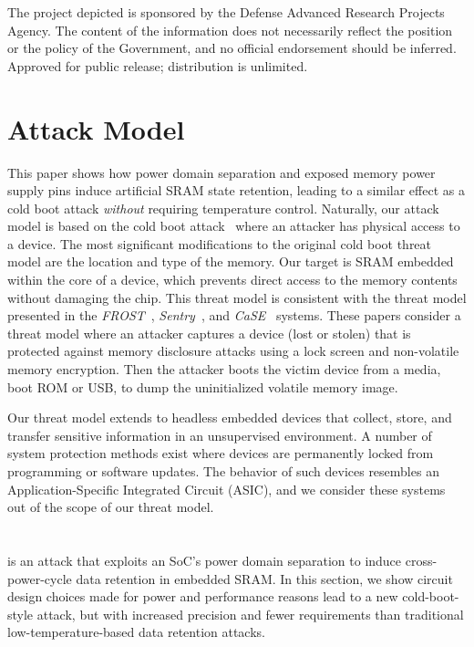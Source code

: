 
\begin{acks}
The project depicted is sponsored by the Defense Advanced Research Projects Agency. The content of the information does
not necessarily reflect the position or the policy of the Government, and no official endorsement should be inferred.
Approved for public release; distribution is unlimited.
\end{acks}


\section{Attack Model}
\label{sec_attack_model}

This paper shows how power domain separation and exposed memory power supply pins induce artificial SRAM state retention, leading to a similar effect as a cold boot attack \textit{without} requiring temperature control.
Naturally, our attack model is based on the cold boot attack~\cite{halderman2009lest} where an attacker has physical access to a device. 
The most significant modifications to the original cold boot threat model are the location and type of the memory. 
Our target is SRAM embedded within the core of a device, which prevents direct access to the memory contents without damaging the chip.
This threat model is consistent with  the threat model presented in the \textit{FROST}~\cite{frost_2013}, \textit{Sentry}~\cite{Sentry}, and \textit{CaSE}~\cite{zhang2016case} systems. 
These papers consider a threat model where an attacker captures a device (\ie lost or stolen) that is protected against memory disclosure attacks using a lock screen and non-volatile memory encryption.
Then the attacker boots the victim device from a media, \eg boot ROM or USB, to dump the uninitialized volatile memory image. 

Our threat model extends to headless embedded devices that collect, store, and transfer sensitive information in an unsupervised environment.
A number of system protection methods exist where devices are permanently locked from programming or software updates.
The behavior of such devices resembles an Application-Specific Integrated Circuit (ASIC), and we consider these systems out of the scope of our threat model.\section{\sys{}}
\label{sec_attack_over_view}

\sys{} is an attack that exploits an SoC's power domain separation to induce cross-power-cycle data retention in embedded SRAM.
In this section, we show circuit design choices made for power and performance reasons lead to a new cold-boot-style attack, but with increased precision and fewer requirements than traditional low-temperature-based data retention attacks. 

